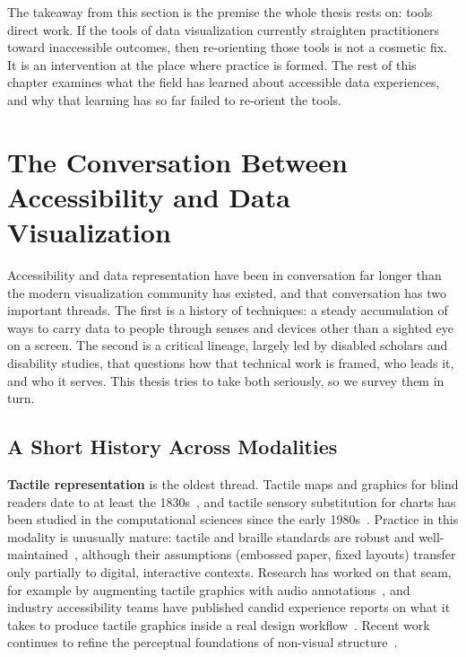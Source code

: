 \documentclass[12pt]{cmuthesis}
\begin{document}
The takeaway from this section is the premise the whole thesis rests on: tools direct work. If the tools of data visualization currently straighten practitioners toward inaccessible outcomes, then re-orienting those tools is not a cosmetic fix. It is an intervention at the place where practice is formed. The rest of this chapter examines what the field has learned about accessible data experiences, and why that learning has so far failed to re-orient the tools.
 
\section{The Conversation Between Accessibility and Data Visualization}
 
Accessibility and data representation have been in conversation far longer than the modern visualization community has existed, and that conversation has two important threads. The first is a history of techniques: a steady accumulation of ways to carry data to people through senses and devices other than a sighted eye on a screen. The second is a critical lineage, largely led by disabled scholars and disability studies, that questions how that technical work is framed, who leads it, and who it serves. This thesis tries to take both seriously, so we survey them in turn.
 
\subsection{A Short History Across Modalities}
 
\textbf{Tactile representation} is the oldest thread. Tactile maps and graphics for blind readers date to at least the 1830s~\cite{HaleExtensive}, and tactile sensory substitution for charts has been studied in the computational sciences since the early 1980s~\cite{Schiff1983}. Practice in this modality is unusually mature: tactile and braille standards are robust and well-maintained~\cite{BANA2010Guidelines}, although their assumptions (embossed paper, fixed layouts) transfer only partially to digital, interactive contexts. Research has worked on that seam, for example by augmenting tactile graphics with audio annotations~\cite{Baker2016Tactile}, and industry accessibility teams have published candid experience reports on what it takes to produce tactile graphics inside a real design workflow~\cite{deGreef2021Interdependent}. Recent work continues to refine the perceptual foundations of non-visual structure~\cite{Mei2025}.
 
\end{document}

